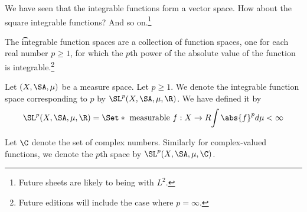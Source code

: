 

We have seen that the integrable functions form a vector space.
How about the square integrable functions?
And so on.\footnote{Future sheets are likely to being with $L^2$.}


The \t{integrable function spaces} are a collection of function spaces, one for each real number $p \geq 1$, for which the $p$th power of the absolute value of the function is integrable.\footnote{Future editions will include the case where $p = \infty$.}


Let $(X, \SA, \mu)$ be a measure space.
Let $p \geq 1$.
We denote the integrable function space corresponding to $p$ by $\SL^p(X, \SA, \mu, \R)$.
We have defined it by
\[
  \SL^p(X, \SA, \mu, \R) = \Set*{
    \text{ measurable } f: X \to R
  }{
    \int \abs{f}^p d\mu < \infty
  }
\]

Let $\C$ denote the set of complex numbers.
Similarly for complex-valued functions, we denote the $p$th space by $\SL^p(X, \SA, \mu, \C)$.

\blankpage
